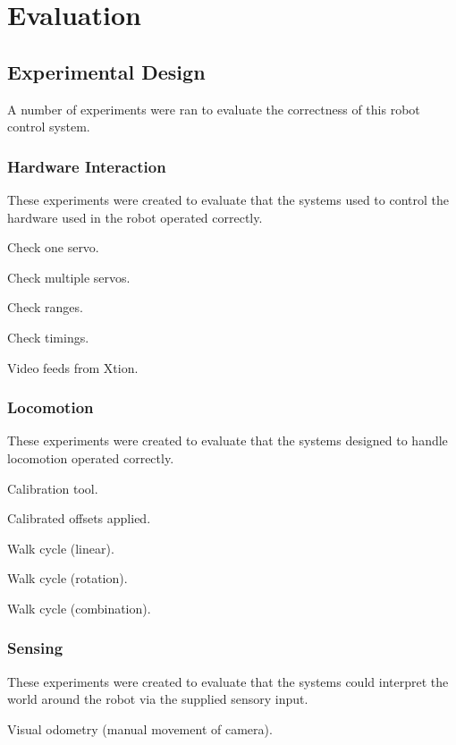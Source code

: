\chapter{Evaluation}


\section{Experimental Design}

A number of experiments were ran to evaluate the correctness of this robot control system.

\subsection{Hardware Interaction}

These experiments were created to evaluate that the systems used to control the hardware used in the robot operated correctly.

Check one servo.

Check multiple servos.

Check ranges.

Check timings.

Video feeds from Xtion.

\subsection{Locomotion}

These experiments were created to evaluate that the systems designed to handle locomotion operated correctly.

Calibration tool.

Calibrated offsets applied.

Walk cycle (linear).

Walk cycle (rotation).

Walk cycle (combination). 

\subsection{Sensing}

These experiments were created to evaluate that the systems could interpret the world around the robot via the supplied sensory input.

Visual odometry (manual movement of camera).

